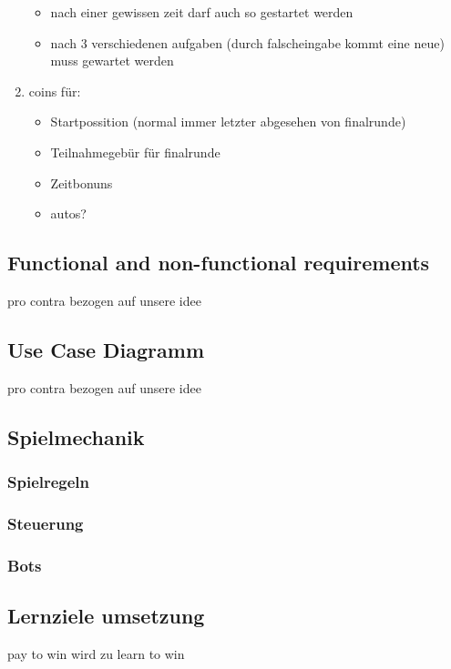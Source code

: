 \begin{enumerate}
\begin{itemize}
        	\item{nach einer gewissen zeit darf auch so gestartet werden}
        	\item{nach 3 verschiedenen aufgaben (durch falscheingabe kommt eine neue) muss gewartet werden}
        \end{itemize}
	\item coins für:
	\begin{itemize}
    	\item{Startpossition (normal immer letzter abgesehen von finalrunde)}
    	\item{Teilnahmegebür für finalrunde}
    	\item{Zeitbonuns}
    	\item{autos?}
    \end{itemize}
\end{enumerate}

\subsection{Functional and non-functional requirements}
	pro contra bezogen auf unsere idee
\subsection{Use Case Diagramm}
	pro contra bezogen auf unsere idee
\subsection{Spielmechanik}
	\subsubsection{Spielregeln}
	\subsubsection{Steuerung}
	\subsubsection{Bots}
\subsection{Lernziele umsetzung}
	pay to win  wird zu  learn to win
